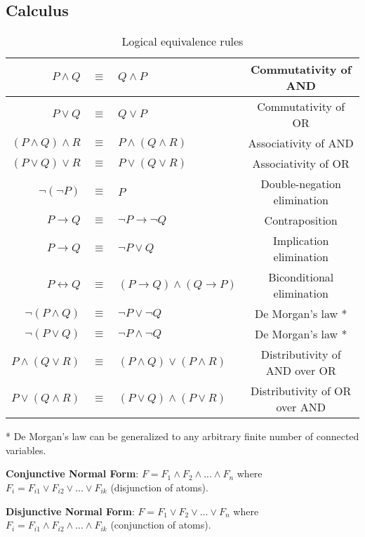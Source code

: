 \documentclass[]{article}
\begin{document}
\subsection{Calculus}

\begin{table}[h]
	\centering
	\caption{Logical equivalence rules}
	\begin{tabular}{ | r  c  l  c | } 
		\hline
		$P \land Q$ & $\equiv$ & $Q \land P$ & Commutativity of AND\\
		\hline
		$P \lor Q$ & $\equiv$ & $Q \lor P$ & Commutativity of OR\\
		\hline
		$(P \land Q) \land R$ & $\equiv$ & $P \land (Q \land R)$ & Associativity of AND\\
		\hline
		$(P \lor Q) \lor R$ & $\equiv$ & $P \lor (Q \lor R)$ & Associativity of OR\\
		\hline
		$\neg(\neg P)$ & $\equiv$ & $P$ & Double-negation elimination\\
		\hline
		$P \rightarrow Q$ & $\equiv$ & $\neg P \rightarrow \neg Q$ & Contraposition\\
		\hline
		$P \rightarrow Q$ & $\equiv$ & $\neg P \lor Q$ & Implication elimination\\
		\hline
		$P \leftrightarrow Q$ & $\equiv$ & $(P \rightarrow Q) \land (Q \rightarrow P)$ & Biconditional elimination \\
		\hline
		$\neg(P \land Q)$ & $\equiv$ & $\neg P \lor \neg Q$ & De Morgan's law *\\
		\hline
		$\neg(P \lor Q)$ & $\equiv$ & $\neg P \land \neg Q$ & De Morgan's law *\\
		\hline
		$P \land (Q \lor R)$ & $\equiv$ & $(P \land Q) \lor (P \land R)$ & Distributivity of AND over OR\\
		\hline
		$P \lor (Q \land R)$ & $\equiv$ & $(P \lor Q) \land (P \lor R)$ & Distributivity of OR over AND\\
		\hline
	\end{tabular}

	* De Morgan's law can be generalized to any arbitrary finite number of connected variables.
\end{table}

\noindent \textbf{Conjunctive Normal Form}: $F = F_1 \land F_2 \land ... \land F_n $ where $F_i = F_{i1} \lor F_{i2} \lor ... \lor F_{ik} $ (disjunction of atoms).

\noindent \textbf{Disjunctive Normal Form}: $F = F_1 \lor F_2 \lor ... \lor F_n $ where $F_i = F_{i1} \land F_{i2} \land ... \land F_{ik} $ (conjunction of atoms).
\end{document}

